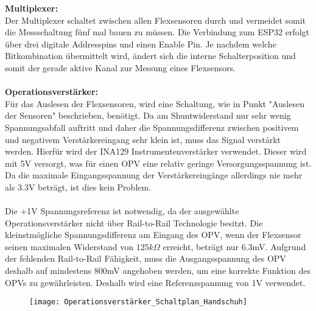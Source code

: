 \documentclass[11pt]{article}
\begin{document}
\textbf{Multiplexer:}
\\
Der Multiplexer schaltet zwischen allen Flexsensoren durch und vermeidet somit die Messschaltung fünf mal bauen zu müssen. 
Die Verbindung zum ESP32 erfolgt über drei digitale Addresspins und einen Enable Pin. Je nachdem welche Bitkombination übermittelt
wird, ändert sich die interne Schalterposition und somit der gerade aktive Kanal zur Messung eines Flexsensors. \\
\\
\textbf{Operationsverstärker:}
\\
Für das Auslesen der Flexsensoren, wird eine Schaltung, wie in Punkt "Auslesen der Sensoren" beschrieben, benötigt. Da am
Shuntwiderstand nur sehr wenig Spannungsabfall auftritt und daher die Spannungsdifferenz zwischen positivem und negativem 
Verstärkereingang sehr klein ist, muss das Signal verstärkt werden. Hierfür wird der INA129 Instrumentenverstärker verwendet.
Dieser wird mit 5V versorgt, was für einen OPV eine relativ geringe Versorgungsspannung ist. Da die maximale Eingangsspannung
der Verstärkereingänge allerdings nie mehr als 3.3V beträgt, ist dies kein Problem. \\
\\
Die +1V Spannungsreferenz ist notwendig, da der ausgewählte Operationsverstärker nicht über Rail-to-Rail Technologie besitzt. 
Die kleinstmögliche Spannungsdifferenz am Eingang des OPV, wenn der Flexsensor seinen maximalen Widerstand von
$125k\Omega$ erreicht, beträgt nur 6.3mV. Aufgrund der fehlenden Rail-to-Rail Fähigkeit, muss die Ausgangsspannung des OPV deshalb
auf mindestens 800mV angehoben werden, um eine korrekte Funktion des OPVs zu gewährleisten. Deshalb wird eine Referenzspannung
von 1V verwendet. \\
\begin{figure}[H]
	\begin{center}
		\scalebox{0.5}
		{\texttt{[image: Operationsverstärker\_Schaltplan\_Handschuh]}}
	\end{center}
\end{figure}
\end{document}
